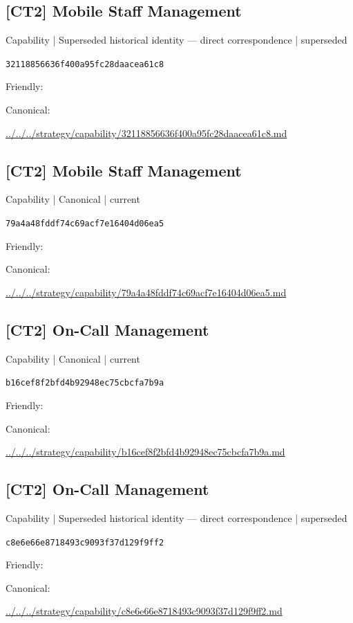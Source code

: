\documentclass[10pt,a4paper]{article}
\begin{document}
\subsection*{[CT2] Mobile Staff Management}
{\small Capability | Superseded historical identity — direct correspondence | superseded}\par
\texttt{32118856636f400a95fc28daacea61c8}\par
Friendly: \par
Canonical: \par
{\footnotesize\url{../../../strategy/capability/32118856636f400a95fc28daacea61c8.md}}\par
\subsection*{[CT2] Mobile Staff Management}
{\small Capability | Canonical | current}\par
\texttt{79a4a48fddf74c69acf7e16404d06ea5}\par
Friendly: \par
Canonical: \par
{\footnotesize\url{../../../strategy/capability/79a4a48fddf74c69acf7e16404d06ea5.md}}\par
\subsection*{[CT2] On-Call Management}
{\small Capability | Canonical | current}\par
\texttt{b16cef8f2bfd4b92948ec75cbcfa7b9a}\par
Friendly: \par
Canonical: \par
{\footnotesize\url{../../../strategy/capability/b16cef8f2bfd4b92948ec75cbcfa7b9a.md}}\par
\subsection*{[CT2] On-Call Management}
{\small Capability | Superseded historical identity — direct correspondence | superseded}\par
\texttt{c8e6e66e8718493c9093f37d129f9ff2}\par
Friendly: \par
Canonical: \par
{\footnotesize\url{../../../strategy/capability/c8e6e66e8718493c9093f37d129f9ff2.md}}\par
\end{document}
